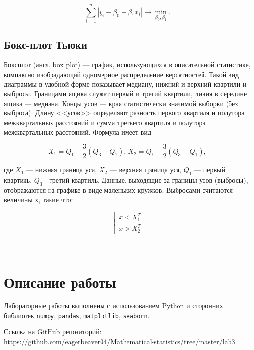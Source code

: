 \documentclass[12pt]{article}
\begin{document}
\begin{equation} \label{eq:lam}
    \sum \limits_{i=1}^n |y_i - \beta_0 - \beta_1 x_i| \rightarrow
    \min_{\beta_0, \beta_1}.
\end{equation}


\subsection{Бокс-плот Тьюки}
Боксплот (англ. box plot) — график, использующихся в описательной статистике, компактно изобрадающий одномерное распределение вероятностей. Такой вид диаграммы в удобной форме показывает медиану, нижний и верхний квартили и выбросы. Границами ящика служат первый и третий квартили, линия в середине ящика — медиана. Концы усов — края статистически значимой выборки (без выброса). Длину <<усов>> определяют разность первого квартиля и полутора межквартальных расстояний и сумма третьего квартиля и полутора межквартальных расстояний. Формула имеет вид

\begin{equation} \label{eq:box_plot}
X_1 = Q_1 - \frac{3}{2}(Q_3 - Q_1), \ X_2 = Q_3 + \frac{3}{2}(Q_3 - Q_1),
\end{equation}

где $X_1$ — нижняя граница уса, $X_2$ — верхняя граница уса, $Q_1$ — первый квартиль, $Q_3$ - третий квартиль.
Данные, выходящие за границы усов (выбросы), отображаются на графике в виде маленьких кружков.
Выбросами считаются величины $х$, такие что:

\begin{equation} \label{eq:outlier}
\left[
  \begin{array}{ll}
      x < X_1^T \\
      x > X_2^T
  \end{array}
\right .
\end{equation}\\\\
\section{Описание работы}
Лабораторные работы выполнены с использованием Python и сторонних
библиотек \verb!numpy!, \verb!pandas!, \verb!matplotlib!, \verb!seaborn!.

Ссылка на GitHub репозиторий:\\
\href{https://github.com/eagerbeaver04/Mathematical-statistics/tree/master/lab3}
{https://github.com/eagerbeaver04/Mathematical-statistics/tree/master/lab3}
\clearpage
\end{document}
